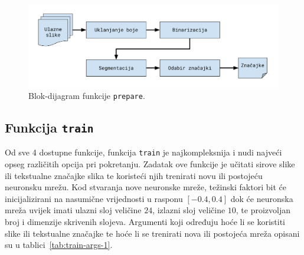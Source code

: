 \begin{figure}[htb]
    \centering
    \includegraphics[width=12cm]{images/chapter4/prepare-diagram.pdf}
    \caption{Blok-dijagram funkcije \texttt{prepare}.}
    \label{fig:prepare-diagram}
\end{figure}

\subsection{Funkcija \texttt{train}}
\label{subsec:funkcija-train}
Od sve 4 dostupne funkcije, funkcija \texttt{train} je najkompleksnija i nudi najveći opseg različitih opcija pri
pokretanju. Zadatak ove funkcije je učitati sirove slike ili tekstualne značajke slika te koristeći njih trenirati
novu ili postojeću neuronsku mrežu. Kod stvaranja nove neuronske mreže, težinski faktori bit će inicijalizirani na
nasumične vrijednosti u rasponu $[-0.4, 0.4]$ dok će neuronska mreža uvijek imati ulazni sloj veličine $24$, izlazni
sloj veličine $10$, te proizvoljan broj i dimenzije skrivenih slojeva. Argumenti koji određuju hoće li se koristiti
slike ili tekstualne značajke te hoće li se trenirati nova ili postojeća mreža opisani su u
tablici\ \ref{tab:train-args-1}.
